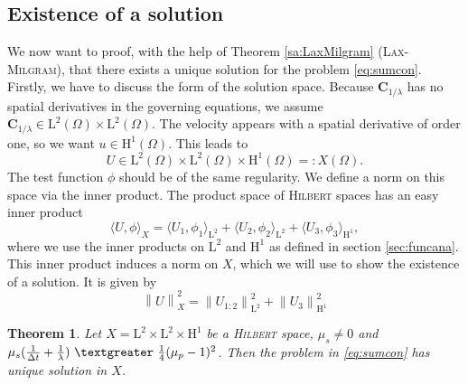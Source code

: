 \documentclass[12pt,a4paper,twoside, open=right]{scrreprt}
\theoremstyle{definition}
\theoremstyle{plain}
\newtheorem{sa}[auf]{Theorem}
\newcommand{\g}{~\textgreater ~}
\newcommand{\norm}[1]{\left\lVert#1\right\rVert}
\newcommand{\bfC}{\bm{C}}
\begin{document}
\subsection{Existence of a solution}
\label{sec:existence}
We now want to proof, with the help of Theorem \ref{sa:LaxMilgram} (\textsc{Lax-Milgram}), that there exists a unique solution for the problem \eqref{eq:sumcon}. Firstly, we have to discuss the form of the solution space. Because $\bfC_{1/\lambda}$ has no spatial derivatives in the governing equations, we assume $\bfC_{1/\lambda}\in \mathrm{L}^2(\Omega)\times \mathrm{L}^2(\Omega)$. The velocity appears with a spatial derivative of order one, so we want $u\in \mathrm{H}^1(\Omega)$. This leads to 
\begin{equation}
    U\in \mathrm{L}^2(\Omega)\times \mathrm{L}^2(\Omega)\times \mathrm{H}^1(\Omega)=:X(\Omega).
\end{equation} The test function $\phi$ should be of the same regularity. We define a norm on this space via the inner product. The product space of \textsc{Hilbert} spaces has an easy inner product
\begin{equation}
    \langle U,\phi\rangle_X = \langle U_1,\phi_1\rangle_{\mathrm{L}^2} +  \langle U_2,\phi_2\rangle_{\mathrm{L}^2} +\langle U_3,\phi_3\rangle_{\mathrm{H}^1},
\end{equation}
where we use the inner products on $\mathrm{L}^2$ and $\mathrm{H}^1$ as defined in section \ref{sec:funcana}. This inner product induces a norm on $X$, which we will use to show the existence of a solution. It is given by
\begin{equation}
    \norm{U}_X^2=\norm{U_{1:2}}_{\mathrm{L}^2}^2+\norm{U_3}_{\mathrm{H}^1}^2
\end{equation}
\begin{sa}
    Let $X=\mathrm{L}^2\times\mathrm{L}^2\times \mathrm{H}^1$ be a \textsc{Hilbert} space, $\mu_s\neq 0$ and $\mu_s(\frac{1}{\Delta t}+\frac{1}{\lambda})\g \frac{1}{4}(\mu_p-1)^2$.
    Then the problem in \eqref{eq:sumcon} has unique solution  in $X$.
\end{sa}
\end{document}
